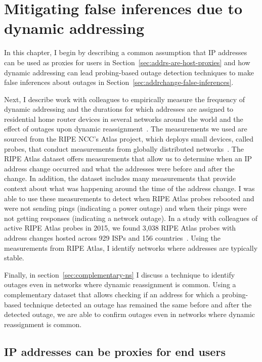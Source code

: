 
\chapter{Mitigating false inferences due to dynamic addressing}

\label{cpt:addr_change}


In this chapter, I begin by describing a common assumption that IP
addresses can be used as proxies for users in
Section~\ref{sec:addrs-are-host-proxies} and how dynamic addressing can lead
probing-based outage detection techniques to make false inferences
about outages in Section~\ref{sec:addrchange-false-inferences}. 

Next, I describe work with colleagues to empirically
measure the frequency of dynamic addressing and the durations for
which addresses are assigned to residential home router devices in
several networks around the world and the effect of outages upon
dynamic reassignment~\cite{addrchange-reasons}. The measurements we
used are sourced from the RIPE NCC's Atlas project, which deploys small devices, called probes, that
conduct measurements from globally distributed
networks~\cite{atlas}. The RIPE Atlas dataset offers measurements that allow us to
determine when an IP address change occurred and what the addresses
were before and after the change. In addition, the dataset includes many
measurements that provide context about what was happening around the
time of the address change. I was able to use these measurements to
detect when RIPE Atlas probes rebooted and were not sending pings
(indicating a power outage) and when their pings were not getting
responses (indicating a network outage). In a study with colleagues of active RIPE
Atlas probes in 2015, we found 3,038 RIPE Atlas probes with address
changes hosted across 929 ISPs and 156
countries~\cite{addrchange-reasons}. Using the measurements from RIPE Atlas, I identify networks
where addresses are typically stable. 

Finally, in section~\ref{sec:complementary-ns} I discuss a technique to identify outages even in networks
where dynamic reassignment is common. Using a complementary dataset
that allows checking if an address for which a probing-based technique
detected an outage has remained the same before and after the detected
outage, we are able to confirm outages even in networks where dynamic
reassignment is common.

\section{IP addresses can be proxies for end users}

